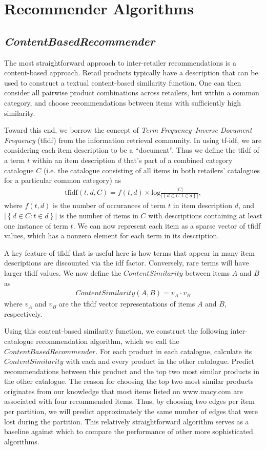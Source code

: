 \documentclass[11pt]{article}
\begin{document}
\section*{Recommender Algorithms}

\subsection*{\em ContentBasedRecommender}
The most straightforward approach to inter-retailer recommendations is a
content-based approach. Retail products typically have a description that can be
used to construct a textual content-based similarity function. One can then
consider all pairwise product combinations across retailers, but within a common
category, and choose recommendations between items with sufficiently high
similarity.

Toward this end, we borrow the concept of {\em Term Frequency--Inverse Document
Frequency} (tfidf) from the information retrieval community. In using tf-idf, we
are considering each item description to be a ``document''.  Thus we define the
tfidf of a term $t$ within an item description $d$ that's part of a combined
category catalogue $C$ (i.e. the catalogue consisting of all items in both
retailers' catalogues for a particular common category) as
\begin{align}
\mathrm{tfidf}(t,d,C) = f(t,d) \times
\mathrm{log}\frac{\left|C\right|}{\left|\left\{d \in C : t \in
d\right\}\right|},
\end{align}
where $f(t,d)$ is the number of occurances of term $t$ in item description $d$,
and $\left|\left\{d \in C : t \in d\right\}\right|$ is the number of items in
$C$ with descriptions containing at least one instance of term $t$.  We can now
represent each item as a sparse vector of tfidf values, which has a nonzero
element for each term in its description.

A key feature of tfidf that is useful here is how terms that appear in many item
descriptions are discounted via the idf factor. Conversely, rare terms will have
larger tfidf values. We now define the $ContentSimilarity$ between items $A$ and
$B$ as
\begin{align}
ContentSimilarity(A,B) = v_A \cdot v_B
\end{align}
where $v_A$ and $v_B$ are the tfidf vector representations of items $A$ and $B$,
respectively.

Using this content-based similarity function, we construct the following
inter-catalogue recommendation algorithm, which we call the $ContentBased
Recommender$. For each product in each catalogue, calculate its
$ContentSimilarity$ with each and every product in the other catalogue. Predict
recommendations between this product and the top two most similar products in
the other catalogue. The reason for choosing the top two most similar products
originates from our knowledge that most items listed on www.macy.com are
associated with four recommended items. Thus, by choosing two edges per item per
partition, we will predict approximately the same number of edges that were lost
during the partition. This relatively straightforward algorithm serves as a
baseline against which to compare the performance of other more sophisticated
algorithms.
\end{document}
